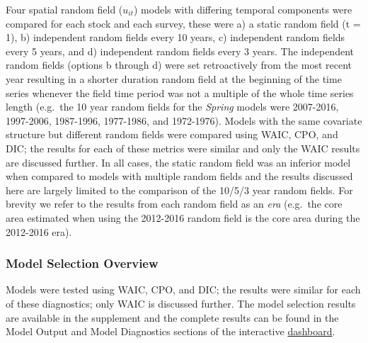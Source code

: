 \documentclass[
]{article}
\begin{document}
Four spatial random field (\(u_{it}\)) models with differing temporal components were compared for each stock and each survey, these were a) a static random field (t = 1), b) independent random fields every 10 years, c) independent random fields every 5 years, and d) independent random fields every 3 years. The independent random fields (options b through d) were set retroactively from the most recent year resulting in a shorter duration random field at the beginning of the time series whenever the field time period was not a multiple of the whole time series length (e.g.~the 10 year random fields for the \emph{Spring} models were 2007-2016, 1997-2006, 1987-1996, 1977-1986, and 1972-1976). Models with the same covariate structure but different random fields were compared using WAIC, CPO, and DIC; the results for each of these metrics were similar and only the WAIC results are discussed further. In all cases, the static random field was an inferior model when compared to models with multiple random fields and the results discussed here are largely limited to the comparison of the 10/5/3 year random fields. For brevity we refer to the results from each random field as an \emph{era} (e.g.~the core area estimated when using the 2012-2016 random field is the core area during the 2012-2016 era).

\hypertarget{model-selection-overview}{%
\subsubsection{Model Selection Overview}\label{model-selection-overview}}

Models were tested using WAIC, CPO, and DIC; the results were similar for each of these diagnostics; only WAIC is discussed further. The model selection results are available in the supplement and the complete results can be found in the Model Output and Model Diagnostics sections of the interactive \href{https://github.com/Dave-Keith/Paper_2_SDMs/tree/master/Dashboard}{dashboard}.
\end{document}
